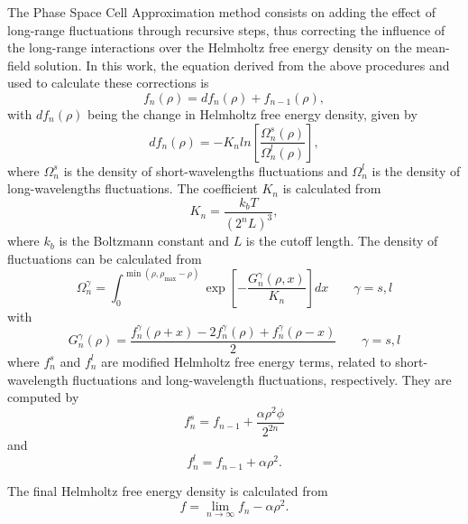 \documentclass[preprint,12pt,3p]{elsarticle}
\begin{document}
	The Phase Space Cell Approximation method consists on adding the effect of long-range fluctuations through recursive steps, thus correcting the influence of the long-range interactions over the Helmholtz free energy density on the mean-field solution. In this work, the equation derived from the above procedures and used to calculate these corrections is
\begin{equation} \label{eq:fn}
    f_{n}(\rho) = df_{n}(\rho) + f_{n-1}(\rho),
\end{equation}
	with $df_{n}(\rho)$ being the change in Helmholtz free energy density, given by
\begin{equation} \label{eq:dfn}
    df_{n}(\rho) = -K_{n} ln\left[\frac{\Omega_{n}^{s}(\rho)}{\Omega_{n}^{l}(\rho)}\right],
\end{equation}
    where $\Omega_{n}^{s}$ is the density of short-wavelengths fluctuations and $\Omega_{n}^{l}$ is the density of long-wavelengths fluctuations. The coefficient $K_{n}$ is calculated from
\begin{equation} \label{eq:Kn}
    K_{n} = \frac{k_{b}T}{(2^{n}L)^3},
\end{equation}
    where $k_{b}$ is the Boltzmann constant and $L$ is the cutoff length. The density of fluctuations can be calculated from
\begin{equation} \label{eq:Omega}
    \Omega_{n}^{\gamma} = \int_{0}^{\min(\rho,\rho_{\max}-\rho)}\exp\left[-\frac{G_{n}^{\gamma}(\rho,x)}{K_{n}}\right]dx \qquad  \gamma = s,l
\end{equation}
with
\begin{equation} \label{eq:Gn}
    G_{n}^{\gamma}(\rho) = \frac{f_{n}^{\gamma}(\rho+x)-2f_{n}^{\gamma}(\rho)+f_{n}^{\gamma}(\rho-x)}{2} \qquad \gamma = s,l
\end{equation}
    where $f_{n}^{s}$ and $f_{n}^{l}$ are modified Helmholtz free energy terms, related to short-wavelength fluctuations and long-wavelength fluctuations, respectively. They are computed by
\begin{equation} \label{eq:fns}
    f_{n}^{s} = f_{n-1} + \frac{\alpha \rho^2 \phi}{2^{2n}}
\end{equation}
and
\begin{equation} \label{eq:fnl}
    f_{n}^{l} = f_{n-1} + \alpha\rho^2.
\end{equation}

    The final Helmholtz free energy density is calculated from
\begin{equation} \label{eq:ff}
    f = \lim_{n \rightarrow \infty} f_{n} - \alpha\rho^2.
\end{equation}
  
\end{document}

